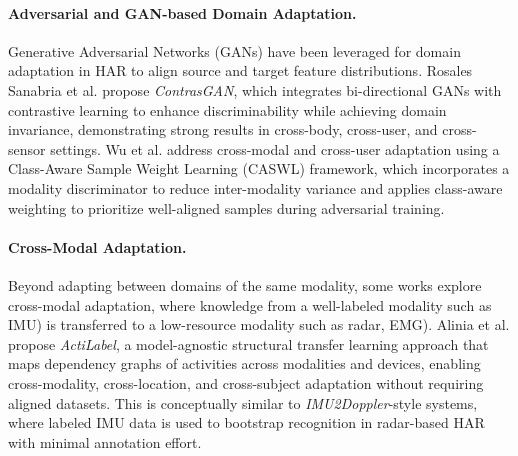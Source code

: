 \paragraph{Adversarial and GAN-based Domain Adaptation.}
Generative Adversarial Networks (GANs) have been leveraged for domain adaptation in HAR to align source and target feature distributions. Rosales Sanabria et al. \cite{sanabria2021contrasgan} propose \emph{ContrasGAN}, which integrates bi-directional GANs with contrastive learning to enhance discriminability while achieving domain invariance, demonstrating strong results in cross-body, cross-user, and cross-sensor settings. Wu et al. \cite{wu2024class} address cross-modal and cross-user adaptation using a Class-Aware Sample Weight Learning (CASWL) framework, which incorporates a modality discriminator to reduce inter-modality variance and applies class-aware weighting to prioritize well-aligned samples during adversarial training.

\paragraph{Cross-Modal Adaptation.}
Beyond adapting between domains of the same modality, some works explore cross-modal adaptation, where knowledge from a well-labeled modality such as IMU) is transferred to a low-resource modality such as radar, EMG). Alinia et al. \cite{alinia2023model} propose \emph{ActiLabel}, a model-agnostic structural transfer learning approach that maps dependency graphs of activities across modalities and devices, enabling cross-modality, cross-location, and cross-subject adaptation without requiring aligned datasets. This is conceptually similar to \emph{IMU2Doppler}-style systems, where labeled IMU data is used to bootstrap recognition in radar-based HAR with minimal annotation effort.

